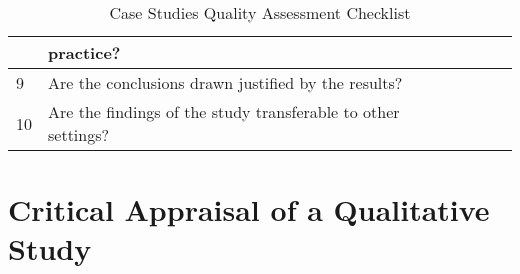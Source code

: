 \begin{table}[H]
\begin{center}
{\begin{tabular}{|l||l|l|l|l|}
                           & practice?                                                        &&& \\
                        \hline
                        9  & Are the conclusions drawn justified by the results?              &&& \\
                        \hline
                        10 & Are the findings of the study transferable to other settings?    &&& \\
                        \hline
                \end{tabular}}
        \end{center}
        \caption{Case Studies Quality Assessment Checklist}
        \label{table:caseStudy}
\end{table}
    

\section{Critical Appraisal of a Qualitative Study}

